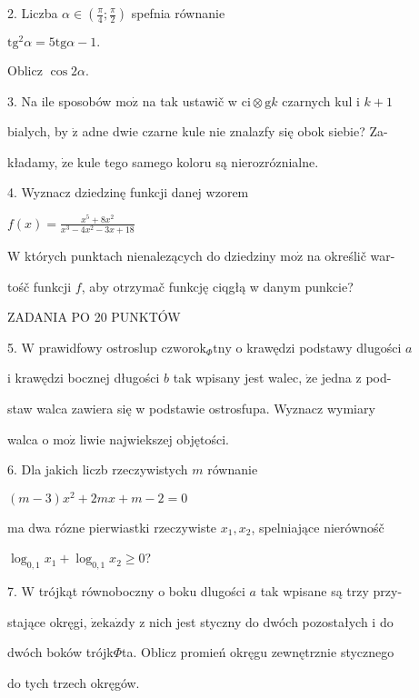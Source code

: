 \documentclass[a4paper,12pt]{article}
\begin{document}
2. Liczba $\alpha\in (\displaystyle \frac{\pi}{4};\frac{\pi}{2})$ spefnia równanie

$\mathrm{t}\mathrm{g}^{2}\alpha=5\mathrm{t}\mathrm{g}\alpha-1.$

Oblicz $\cos 2\alpha.$

3. Na ile sposobów $\mathrm{m}\mathrm{o}\dot{\mathrm{z}}$ na tak ustawič w $\mathrm{c}\mathrm{i}\otimes \mathrm{g} k$ czarnych kul i $k+1$

bialych, by $\dot{\mathrm{z}}$ adne dwie czarne kule nie znalazfy się obok siebie? Za-

kładamy, $\dot{\mathrm{z}}\mathrm{e}$ kule tego samego koloru są nierozróznialne.

4. Wyznacz dziedzinę funkcji danej wzorem

$f(x)=\displaystyle \frac{x^{5}+8x^{2}}{x^{3}-4x^{2}-3x+18}$

$\mathrm{W}$ których punktach nienalezących do dziedziny $\mathrm{m}\mathrm{o}\dot{\mathrm{z}}$ na określič war-

tośč funkcji $f$, aby otrzymač funkcję ciqgłą w danym punkcie?

ZADANIA PO 20 PUNKTÓW

5. $\mathrm{W}$ prawidfowy ostroslup $\mathrm{c}\mathrm{z}\mathrm{w}\mathrm{o}\mathrm{r}\mathrm{o}\mathrm{k}_{\Phi}\mathrm{t}\mathrm{n}\mathrm{y}$ o krawędzi podstawy dlugości $a$

i krawędzi bocznej długości $b$ tak wpisany jest walec, $\dot{\mathrm{z}}\mathrm{e}$ jedna z pod-

staw walca zawiera się w podstawie ostrosfupa. Wyznacz wymiary

walca o $\mathrm{m}\mathrm{o}\dot{\mathrm{z}}$ liwie najwiekszej objętości.

6. Dla jakich liczb rzeczywistych $m$ równanie

$(m-3)x^{2}+2mx+m-2=0$

ma dwa rózne pierwiastki rzeczywiste $x_{1}, x_{2}$, spelniające nierównośč

$\log_{0,1}x_{1}+\log_{0,1}x_{2}\geq 0$?

7. $\mathrm{W}$ trójkąt równoboczny o boku dlugości $a$ tak wpisane są trzy przy-

stające okręgi, $\dot{\mathrm{z}}\mathrm{e}\mathrm{k}\mathrm{a}\dot{\mathrm{z}}\mathrm{d}\mathrm{y}$ z nich jest styczny do dwóch pozostałych i do

dwóch boków trójk$\Phi$ta. Oblicz promień okręgu zewnętrznie stycznego

do tych trzech okręgów.
\end{document}
